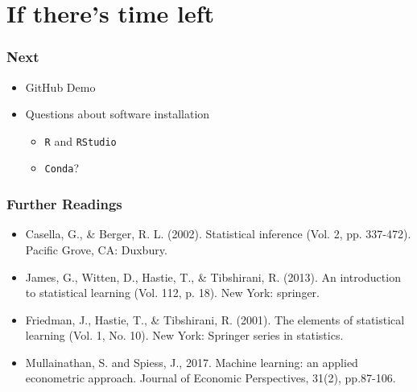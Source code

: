\documentclass[
  shownotes,
  xcolor={svgnames},
  hyperref={colorlinks,citecolor=DarkBlue,linkcolor=DarkRed,urlcolor=DarkBlue}
  ]{beamer}
\begin{document}

\section{If there's time left}

\begin{frame}
\frametitle{Next}
  
  \begin{itemize} 
  \item  GitHub Demo
  \bigskip
  \item Questions about software installation
  \medskip
    \begin{itemize} 
      \item  \texttt{R} and \texttt{RStudio}
      \medskip
      \item \texttt{Conda}? 
    \end{itemize}
  \end{itemize}


\end{frame}


\begin{frame}
\frametitle{Further Readings}

\begin{itemize}
  \item Casella, G., \& Berger, R. L. (2002). Statistical inference (Vol. 2, pp. 337-472). Pacific Grove, CA: Duxbury.
  \bigskip
  \item James, G., Witten, D., Hastie, T., \& Tibshirani, R. (2013). An introduction to statistical learning (Vol. 112, p. 18). New York: springer.
  \bigskip
  \item Friedman, J., Hastie, T., \& Tibshirani, R. (2001). The elements of statistical learning (Vol. 1, No. 10). New York: Springer series in statistics.
  \bigskip
  \item Mullainathan, S. and Spiess, J., 2017. Machine learning: an applied econometric approach. Journal of Economic Perspectives, 31(2), pp.87-106.
  

\end{itemize}

\end{frame}

\end{document}
